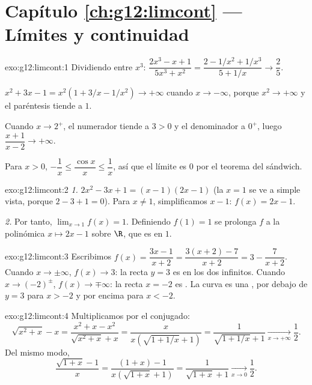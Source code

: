 \section*{Capítulo \ref{ch:g12:limcont} --- Límites y continuidad}

\begin{solution}{exo:g12:limcont:1}
Dividiendo entre $x^3$:
$\dfrac{2x^3 - x + 1}{5x^3 + x^2} = \dfrac{2 - 1/x^2 + 1/x^3}{5 + 1/x}
\to \dfrac{2}{5}$.

$x^2 + 3x - 1 = x^2(1 + 3/x - 1/x^2) \to +\infty$ cuando $x \to -\infty$,
porque $x^2 \to +\infty$ y el paréntesis tiende a $1$.

Cuando $x \to 2^+$, el numerador tiende a $3 > 0$ y el denominador a
$0^+$, luego $\dfrac{x+1}{x-2} \to +\infty$.

Para $x > 0$, $-\dfrac1x \leq \dfrac{\cos x}{x} \leq \dfrac1x$, así que el
límite es $0$ por el teorema del sándwich.
\end{solution}

\begin{solution}{exo:g12:limcont:2}
\emph{1.} $2x^2 - 3x + 1 = (x-1)(2x-1)$ (la  $x=1$ se ve a simple
vista, porque $2 - 3 + 1 = 0$). Para $x \neq 1$, simplificamos $x - 1$:
$f(x) = 2x - 1$.

\emph{2.} Por tanto, $\lim_{x\to1} f(x) = 1$. Definiendo $f(1) = 1$ se
prolonga $f$ a la  polinómica $x \mapsto 2x-1$ sobre $\R$, que es
 en $1$.
\end{solution}

\begin{solution}{exo:g12:limcont:3}
Escribimos $f(x) = \dfrac{3x - 1}{x + 2} = \dfrac{3(x+2) - 7}{x+2}
= 3 - \dfrac{7}{x+2}$. Cuando $x \to \pm\infty$, $f(x) \to 3$: la recta
$y = 3$ es  en los dos infinitos. Cuando
$x \to (-2)^\pm$, $f(x) \to \mp\infty$: la recta $x = -2$ es . La curva es una , por debajo de $y=3$ para $x > -2$ y
por encima para $x < -2$.
\end{solution}

\begin{solution}{exo:g12:limcont:4}
Multiplicamos por el conjugado:
\[
\sqrt{x^2 + x} - x = \frac{x^2 + x - x^2}{\sqrt{x^2+x} + x}
= \frac{x}{x\left(\sqrt{1 + 1/x} + 1\right)}
= \frac{1}{\sqrt{1 + 1/x} + 1}
\xrightarrow[x\to+\infty]{} \frac{1}{2}.
\]
Del mismo modo,
\[
\frac{\sqrt{1+x} - 1}{x} = \frac{(1+x) - 1}{x\left(\sqrt{1+x} + 1\right)}
= \frac{1}{\sqrt{1+x} + 1} \xrightarrow[x\to0]{} \frac{1}{2}.
\]
\end{solution}

